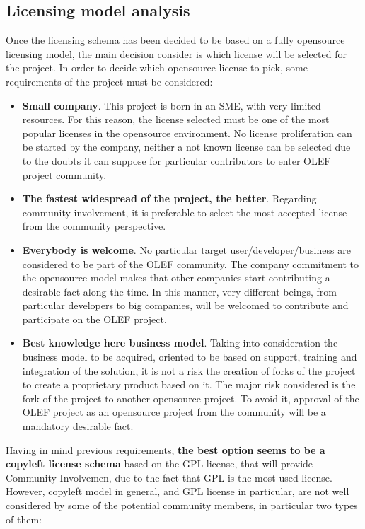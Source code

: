 \documentclass[11pt]{article}
\begin{document}
\subsection{Licensing model analysis}
Once the licensing schema has been decided to be based on a fully opensource licensing model, the main decision consider is which license will be selected for the project. In order to decide which opensource license to pick, some requirements of the project must be considered:
\begin{itemize}\itemsep0pt
\item{\textbf{Small company}}. This project is born in an SME, with very limited resources. For this reason, the license selected must be one of the most popular licenses in the opensource environment. No license proliferation can be started by the company, neither a not known license can be selected due to the doubts it can suppose for particular contributors to enter OLEF project community.
\item{\textbf{The fastest widespread of the project, the better}}. Regarding community involvement, it is preferable to select the most accepted license from the community perspective.
\item{\textbf{Everybody is welcome}}. No particular target user/developer/business are considered to be part of the OLEF community. The company commitment to the opensource model makes that other companies start contributing a desirable fact along the time. In this manner, very different beings, from particular developers to big companies, will be welcomed to contribute and participate on the OLEF project.
\item{\textbf{Best knowledge here business model}}. Taking into consideration the business model to be acquired, oriented to be based on support, training and integration of the solution, it is not a risk the creation of forks of the project to create a proprietary product based on it. The major risk considered is the fork of the project to another opensource project. To avoid it, approval of the OLEF project as an opensource project from the community will be a mandatory desirable fact.
\end{itemize}
Having in mind previous requirements, \textbf{the best option seems to be a copyleft license schema} based on the GPL license, that will provide Community Involvemen, due to the fact that GPL is the most used license.
However, copyleft model in general, and GPL license in particular, are not well considered by some of the potential community members, in particular two types of them:
\end{document}

